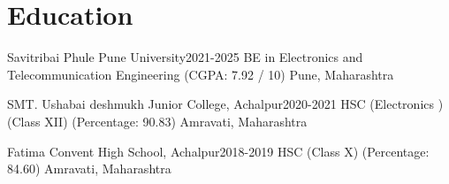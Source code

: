 \section{Education}
    \resumeSubHeadingListStart

    \resumeSubheading
    {Savitribai Phule Pune University}{2021-2025}
    {BE in Electronics and Telecommunication Engineering (CGPA: 7.92 / 10) }{Pune, Maharashtra}


    \resumeSubheading
    {SMT. Ushabai deshmukh Junior College, Achalpur}{2020-2021}
    {HSC (Electronics )(Class XII)  (Percentage: 90.83) }{Amravati, Maharashtra}
    
     \resumeSubheading
    {Fatima Convent High School, Achalpur}{2018-2019}
    {HSC (Class X)  (Percentage: 84.60) }{Amravati, Maharashtra}

    \resumeSubHeadingListEnd